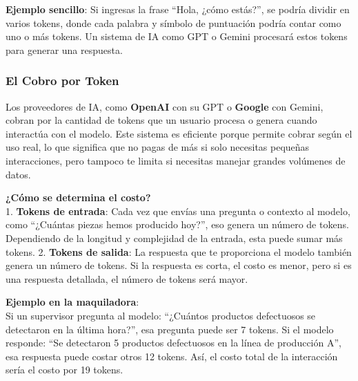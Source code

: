 \documentclass[
  10pt,
  letterpaper,
]{book}
\begin{document}
\textbf{Ejemplo sencillo}: Si ingresas la frase ``Hola, ¿cómo estás?'',
se podría dividir en varios tokens, donde cada palabra y símbolo de
puntuación podría contar como uno o más tokens. Un sistema de IA como
GPT o Gemini procesará estos tokens para generar una respuesta.

\subsubsection{\texorpdfstring{\textbf{El Cobro por
Token}}{El Cobro por Token}}\label{el-cobro-por-token}

Los proveedores de IA, como \textbf{OpenAI} con su GPT o \textbf{Google}
con Gemini, cobran por la cantidad de tokens que un usuario procesa o
genera cuando interactúa con el modelo. Este sistema es eficiente porque
permite cobrar según el uso real, lo que significa que no pagas de más
si solo necesitas pequeñas interacciones, pero tampoco te limita si
necesitas manejar grandes volúmenes de datos.

\textbf{¿Cómo se determina el costo?}\\
1. \textbf{Tokens de entrada}: Cada vez que envías una pregunta o
contexto al modelo, como ``¿Cuántas piezas hemos producido hoy?'', eso
genera un número de tokens. Dependiendo de la longitud y complejidad de
la entrada, esta puede sumar más tokens. 2. \textbf{Tokens de salida}:
La respuesta que te proporciona el modelo también genera un número de
tokens. Si la respuesta es corta, el costo es menor, pero si es una
respuesta detallada, el número de tokens será mayor.

\textbf{Ejemplo en la maquiladora}:\\
Si un supervisor pregunta al modelo: ``¿Cuántos productos defectuosos se
detectaron en la última hora?'', esa pregunta puede ser 7 tokens. Si el
modelo responde: ``Se detectaron 5 productos defectuosos en la línea de
producción A'', esa respuesta puede costar otros 12 tokens. Así, el
costo total de la interacción sería el costo por 19 tokens.
\end{document}

